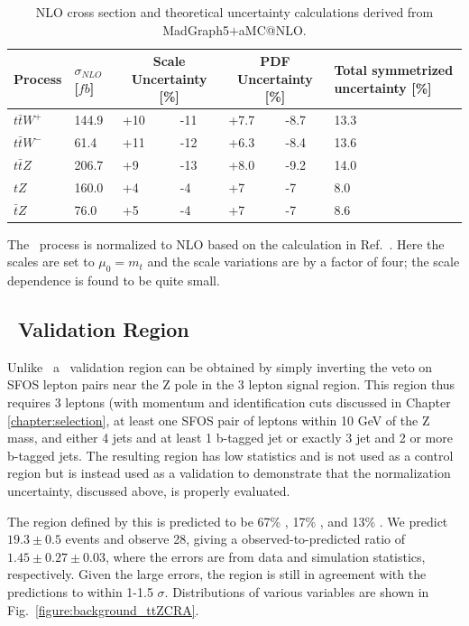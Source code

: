 \begin{table}%
\begin{center}
\caption{NLO cross section and theoretical uncertainty
  calculations derived from MadGraph5$+$aMC@NLO.}
\label{tab:ttVXSunc}
\begin{tabular}{l|p{}|p{}|p{}|p{}|p{}|p{}}
\hline
Process & $\sigma_{NLO}$ [$fb$] & \multicolumn{2}{c|}{Scale
Uncertainty [\%]} & \multicolumn{2}{c|}{PDF Uncertainty [\%]} & Total
symmetrized uncertainty [\%] \\
\hline
\hline
$t\bar{t}W^{+}$ & 144.9 & +10 & -11 & +7.7 & -8.7 & 13.3 \\
$t\bar{t}W^{-}$ & 61.4  & +11 & -12 & +6.3 & -8.4 & 13.6 \\
$t\bar{t}Z$     & 206.7 & +9  & -13 & +8.0 & -9.2 & 14.0 \\
$tZ$            & 160.0 & +4  & -4  & +7   & -7   & 8.0 \\
$\bar{t}Z$      & 76.0  & +5  & -4  & +7   & -7   & 8.6 \\
\hline
\end{tabular}
\end{center}
\end{table}

The \tZ\ process is normalized to NLO based on the calculation in Ref.~\cite{Campbell:2013yla}.  Here the scales are set to $\mu_0 = m_t$ and the scale variations are by a factor of four; the scale dependence is found to be quite small.


\subsection{\ttZ\ Validation Region}

Unlike \ttW\, a \ttZ\ validation region can be obtained by simply inverting the veto on SFOS lepton pairs near the Z pole in the 3 lepton signal region. This region thus requires 3 leptons (with momentum and identification cuts discussed in Chapter \ref{chapter:selection}, at least one SFOS pair of leptons within 10 GeV of the Z mass, and either 4 jets and at least 1 b-tagged jet or exactly 3 jet and 2 or more b-tagged jets. The resulting region has low statistics and is not used as a control region but is instead used as a validation to demonstrate that the normalization uncertainty, discussed above, is properly evaluated. 

The region defined by this is predicted to be 67\% \ttZ, 17\% \WZ, and 13\% \tZ.  We predict $19.3 \pm 0.5$ events and observe 28, giving a observed-to-predicted ratio of $1.45 \pm 0.27 \pm 0.03$, where the errors are from data and simulation statistics, respectively. Given the large errors, the region is still in agreement with the predictions to within 1-1.5 $\sigma$.  Distributions of various variables are shown in Fig.~\ref{figure:background_ttZCRA}.  

